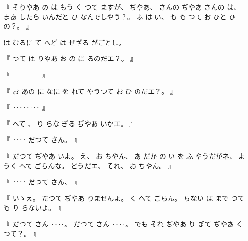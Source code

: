 %
『
そりやあ
の
は
もう
く
つて
ますが、
%
ぢやあ、
%
さんの
%
ぢやあ
さんの
は、
%
まあ
したら
いんだと
ひ
なんでしやう？。
%
ふ
は
い、
%
も
も
つて
お
ひと
ひの？。
』

%
は
むるに
て
へど
は
ぜざる
がごとし。

%
『
つて
は
りやあ
お
の
に
るのだエ？。
』

%
『
‥‥‥‥
』

%
『
お
あの
に
なに
を
れて
やうつて
お
ひ
のだエ？。
』

%
『
‥‥‥‥
』

%
『
へて
、
%
り
らな
ぎる
ぢやあ
いかエ。
』

%
『
‥‥
だつて
さん。
』

%
『
だつて
ぢやあ
いよ。
%
え、
%
お
ちやん、
%
あ
だか
の
い
を
ふ
やうだがネ、
%
ようく
へて
ごらんな。
%
どうだエ、
それ、
%
お
ちやん。
』

%
『
‥‥
だつて
さん、
』

%
『
いゝえ。
%
だつて
ぢやあ
りませんよ。
%
く
へて
ごらん。
%
らない
は
まで
つても
り
らないよ。
』

%
『
だつて
さん
‥‥。
%
だつて
さん
‥‥。
%
でも
それ
ぢやあ
り
ぎて
ぢやあ
くつて？。
』
